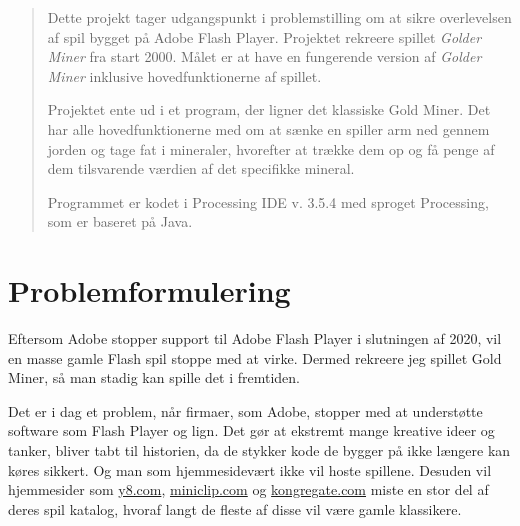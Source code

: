 \documentclass[12pt,a4paper]{article}
\begin{document}
\begin{titlepage}

\end{titlepage}

\begin{abstract}
    Dette projekt tager udgangspunkt i problemstilling om at sikre overlevelsen af spil bygget på Adobe Flash Player. Projektet rekreere spillet \emph{Golder Miner} fra start 2000. Målet er at have en fungerende version af \emph{Golder Miner} inklusive hovedfunktionerne af spillet. 

    Projektet ente ud i et program, der ligner det klassiske Gold Miner. Det har alle hovedfunktionerne med om at sænke en spiller arm ned gennem jorden og tage fat i mineraler, hvorefter at trække dem op og få penge af dem tilsvarende værdien af det specifikke mineral.
    
    Programmet er kodet i Processing IDE v. 3.5.4 med sproget Processing, som er baseret på Java. 

\end{abstract}

\newpage

\tableofcontents

\newpage

\section{Problemformulering}
    Eftersom Adobe stopper support til Adobe Flash Player i slutningen af 2020, vil en masse gamle Flash spil stoppe med at virke. Dermed rekreere jeg spillet Gold Miner, så man stadig kan spille det i fremtiden.

    Det er i dag et problem, når firmaer, som Adobe, stopper med at understøtte software som Flash Player og lign. Det gør at ekstremt mange kreative ideer og tanker, bliver tabt til historien, da de stykker kode de bygger på ikke længere kan køres sikkert. Og man som hjemmesidevært ikke vil hoste spillene. Desuden vil hjemmesider som \url{y8.com}, \url{miniclip.com} og \url{kongregate.com} miste en stor del af deres spil katalog, hvoraf langt de fleste af disse vil være gamle klassikere.
\end{document}
